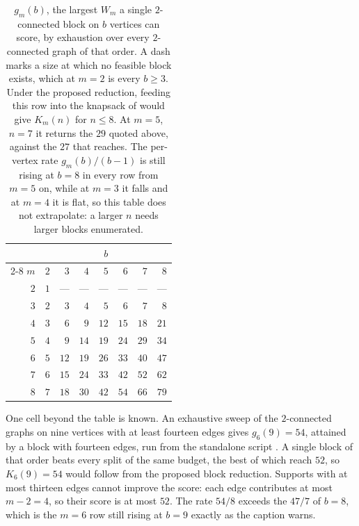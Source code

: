 \begin{table}[htbp]
  \centering
  \small
  \begin{tabular}{@{}r rrrrrrr@{}}
    \toprule
    & \multicolumn{7}{c}{$b$} \\
    \cmidrule(l){2-8}
    $m$ & $2$ & $3$ & $4$ & $5$ & $6$ & $7$ & $8$ \\
    \midrule
    $2$ & $1$ & --- & --- & --- & --- & --- & --- \\
    $3$ & $2$ & $3$ & $4$ & $5$ & $6$ & $7$ & $8$ \\
    $4$ & $3$ & $6$ & $9$ & $12$ & $15$ & $18$ & $21$ \\
    $5$ & $4$ & $9$ & $14$ & $19$ & $24$ & $29$ & $34$ \\
    $6$ & $5$ & $12$ & $19$ & $26$ & $33$ & $40$ & $47$ \\
    $7$ & $6$ & $15$ & $24$ & $33$ & $42$ & $52$ & $62$ \\
    $8$ & $7$ & $18$ & $30$ & $42$ & $54$ & $66$ & $79$ \\
    \bottomrule
  \end{tabular}
  \caption[Best score of one block]{$g_m(b)$, the largest $W_m$ a single
  $2$-connected block on $b$ vertices can score, by exhaustion over every
  $2$-connected graph of that order. A dash marks a size at which no feasible
  block exists, which at $m=2$ is every $b \ge 3$. Under the proposed reduction,
  feeding this row into the knapsack of  would give $K_m(n)$ for $n \le 8$. At
  $m=5$, $n=7$ it returns the $29$ quoted above, against the $27$ that
   reaches. The per-vertex rate $g_m(b)/(b-1)$ is
  still rising at $b=8$ in every row from $m=5$ on, while at $m=3$ it falls and
  at $m=4$ it is flat, so this table does not extrapolate: a larger $n$ needs
  larger blocks enumerated.}
  \label{tab:multi-vertex-blocks}
\end{table}

One cell beyond the table is known. An exhaustive sweep of the $2$-connected
graphs on nine vertices with at least fourteen edges gives $g_6(9) = 54$, attained by a block with fourteen
edges, run from the standalone script
. A single block of that order
beats every split of the same budget, the best of which reach $52$, so
$K_6(9) = 54$ would follow from the proposed block reduction. Supports with
at most thirteen edges cannot improve the score: each edge contributes at
most $m-2=4$, so their score is at most $52$.
The rate $54/8$ exceeds the $47/7$ of $b=8$, which is the $m=6$
row still rising at $b=9$ exactly as the caption warns.


